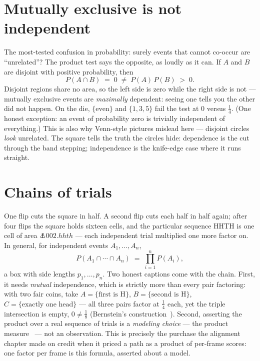 \begin{narrative}
\section{Mutually exclusive is not independent}

The most-tested confusion in probability: surely events that cannot
co-occur are ``unrelated''? The product test says the opposite, as
loudly as it can. If $A$ and $B$ are disjoint with positive
probability, then
\[
  P(A \cap B) \;=\; 0 \;\neq\; P(A)\,P(B) \;>\; 0 .
\]
Disjoint regions share no area, so the left side is zero while the
right side is not — mutually exclusive events are \emph{maximally}
dependent: seeing one tells you the other did not happen. On the die,
$\{\text{even}\}$ and $\{1,3,5\}$ fail the test at $0$ versus
$\tfrac14$. (One honest exception: an event of probability zero is
trivially independent of everything.) This is also why Venn-style
pictures mislead here — disjoint circles \emph{look} unrelated. The
square tells the truth the circles hide: dependence is the cut through
the band stepping; independence is the knife-edge case where it runs
straight.

\section{Chains of trials}

One flip cuts the square in half. A second flip cuts each half in half
again; after four flips the square holds sixteen cells, and the
particular sequence HHTH is one cell of area
$\anchor{002.hhth}$ — each independent trial multiplied one more factor
on. In general, for independent events $A_1, \dots, A_n$,
\[
  P(A_1 \cap \cdots \cap A_n) \;=\; \prod_{i=1}^{n} P(A_i),
\]
a box with side lengths $p_1, \dots, p_n$. Two honest captions come
with the chain. First, it needs \emph{mutual} independence, which is
strictly more than every pair factoring: with two fair coins, take
$A = \{\text{first is H}\}$, $B = \{\text{second is H}\}$,
$C = \{\text{exactly one head}\}$ — all three pairs factor at
$\tfrac14$ each, yet the triple intersection is empty, $0 \neq \tfrac18$
(Bernstein's construction~\cite{probability-wikipedia-pairwise-independence}).
Second, asserting the product over a real sequence of trials is a
\emph{modeling choice} — the product
measure~\cite{probability-mit-6-041-lecture-13-the-bernoulli-process} —
not an observation. This is precisely the purchase the alignment
chapter made on credit when it priced a path as a product of per-frame
scores: one factor per frame is this formula, asserted about a model.


\end{narrative}
